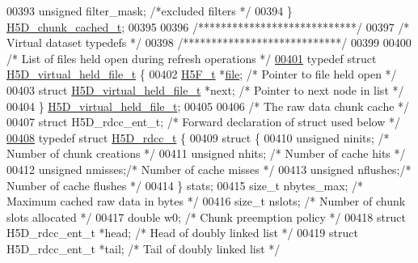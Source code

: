 \begin{DoxyCode}
00393     \textcolor{keywordtype}{unsigned}    filter\_mask;            \textcolor{comment}{/*excluded filters  */}
00394 \} \hyperlink{struct_h5_d__chunk__cached__t}{H5D\_chunk\_cached\_t};
00395 
00396 \textcolor{comment}{/****************************/}
00397 \textcolor{comment}{/* Virtual dataset typedefs */}
00398 \textcolor{comment}{/****************************/}
00399 
00400 \textcolor{comment}{/* List of files held open during refresh operations */}
\hyperlink{struct_h5_d__virtual__held__file__t}{00401} \textcolor{keyword}{typedef} \textcolor{keyword}{struct }\hyperlink{struct_h5_d__virtual__held__file__t}{H5D\_virtual\_held\_file\_t} \{
00402     \hyperlink{struct_h5_f__t}{H5F\_t} *\hyperlink{structfile}{file};                                \textcolor{comment}{/* Pointer to file held open */}
00403     \textcolor{keyword}{struct }\hyperlink{struct_h5_d__virtual__held__file__t}{H5D\_virtual\_held\_file\_t} *next;       \textcolor{comment}{/* Pointer to next node in list */}
00404 \} \hyperlink{struct_h5_d__virtual__held__file__t}{H5D\_virtual\_held\_file\_t};
00405 
00406 \textcolor{comment}{/* The raw data chunk cache */}
00407 \textcolor{keyword}{struct }H5D\_rdcc\_ent\_t;  \textcolor{comment}{/* Forward declaration of struct used below */}
\hyperlink{struct_h5_d__rdcc__t}{00408} \textcolor{keyword}{typedef} \textcolor{keyword}{struct }\hyperlink{struct_h5_d__rdcc__t}{H5D\_rdcc\_t} \{
00409     \textcolor{keyword}{struct }\{
00410         \textcolor{keywordtype}{unsigned}    ninits; \textcolor{comment}{/* Number of chunk creations        */}
00411         \textcolor{keywordtype}{unsigned}    nhits;  \textcolor{comment}{/* Number of cache hits         */}
00412         \textcolor{keywordtype}{unsigned}    nmisses;\textcolor{comment}{/* Number of cache misses       */}
00413         \textcolor{keywordtype}{unsigned}    nflushes;\textcolor{comment}{/* Number of cache flushes     */}
00414     \} stats;
00415     \textcolor{keywordtype}{size\_t}      nbytes\_max; \textcolor{comment}{/* Maximum cached raw data in bytes */}
00416     \textcolor{keywordtype}{size\_t}      nslots; \textcolor{comment}{/* Number of chunk slots allocated  */}
00417     \textcolor{keywordtype}{double}      w0;     \textcolor{comment}{/* Chunk preemption policy          */}
00418     \textcolor{keyword}{struct }H5D\_rdcc\_ent\_t *head; \textcolor{comment}{/* Head of doubly linked list      */}
00419     \textcolor{keyword}{struct }H5D\_rdcc\_ent\_t *tail; \textcolor{comment}{/* Tail of doubly linked list      */}

\end{DoxyCode}
